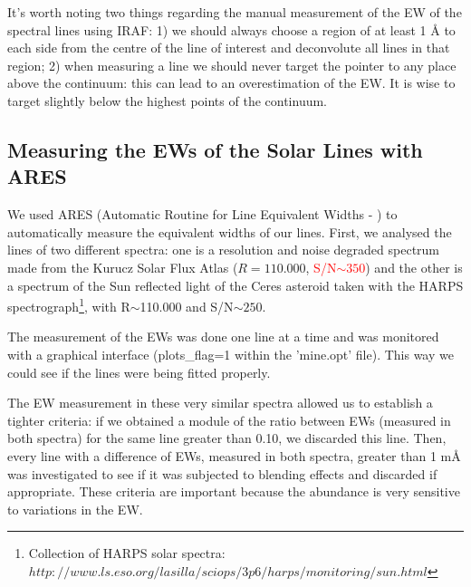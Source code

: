 \documentclass[dvips,12pt,a4paper]{report}
\begin{document}
{It's worth noting two things regarding the manual measurement of the EW of the spectral lines using IRAF: 1) we should always choose a region of at least 1 \AA{} to each side from the centre of the line of interest and deconvolute all lines in that region; 2) when measuring a line we should never target the pointer to any place above the continuum: this can lead to an overestimation of the EW. It is wise to target slightly below the highest points of the continuum.

\subsection {Measuring the EWs of the Solar Lines with ARES}
\label{ARES}
We used ARES (Automatic Routine for Line Equivalent Widths - \citeauthor{Sousa-2007} \citeyear{Sousa-2007}) to automatically measure the equivalent widths of our lines. First, we analysed the lines of two different spectra: one is a resolution and noise degraded spectrum made from the Kurucz Solar Flux Atlas ($R=110.000$, \textcolor{red}{S/N$\sim350$}) and the other is a spectrum of the Sun reflected light of the Ceres asteroid taken with the HARPS spectrograph\footnote{Collection of HARPS solar spectra: $http://www.ls.eso.org/lasilla/sciops/3p6/harps/monitoring/sun.html$}, with R$\sim$110.000 and S/N$\sim250$. %



The measurement of the EWs was done one line at a time and was monitored with a graphical interface (plots\_flag=1 within the 'mine.opt' file). This way we could see if the lines were being fitted properly.

The EW measurement in these very similar spectra allowed us to establish a tighter criteria: if we obtained a module of the ratio between EWs (measured in both spectra) for the same line greater than 0.10, we  discarded this line. Then, every line with a difference of EWs, measured in both spectra, greater than 1 m\AA{} was investigated to see if it was subjected to blending effects and discarded if appropriate. These criteria are important because the abundance is very sensitive to variations in the EW. %

}
\end{document}
